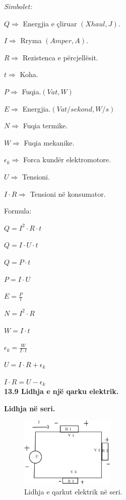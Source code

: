 \documentclass[twocolumn]{article}
\begin{document}
	\begin{center}
		\textit{Simbolet:}
	\end{center}
	
	$Q \Rightarrow $ Energjia e çliruar $(Xhaul,J)$.
	
	$I \Rightarrow $ Rryma $(Amper ,A )$.
	
	$R \Rightarrow $ Rezistenca e përcjellësit.
	
	$t \Rightarrow$ Koha.
	
	$P \Rightarrow $ Fuqia.$(Vat,W)$
	
	$E \Rightarrow $ Energjia.$(Vat/sekond,W/s)$
	
	$N \Rightarrow $ Fuqia termike.
	
	$W \Rightarrow $ Fuqia mekanike.
	
	$\epsilon_k \Rightarrow $ Forca kundër elektromotore.
	
	$U \Rightarrow $ Tensioni.
	
	$I \cdot R \Rightarrow$ Tensioni në konsumator.
	\begin{center}
		Formula:
	\end{center}
	
	$Q=I^2 \cdot R \cdot t$
	
	$Q=I \cdot U \cdot t$
	
	$Q= P\cdot t$
	
	$P= I \cdot U$
	
	$E=\frac{P}{t}$
	
	$N=I^2 \cdot R$
	
	$W=I \cdot t$
	
	$\epsilon_k=\frac{W}{I \cdot t}$
	
	$U=I \cdot R + \epsilon_k$
	
	$I \cdot R =  U - \epsilon_k$\\
	
	\textbf{13.9 Lidhja e një qarku elektrik.}
	
	\begin{center}
		\textbf{Lidhja në seri.}
	\end{center}
	
	\begin{figure}[h]
		\includegraphics[width=45mm]{Imazhet/qarku seri.png}
		\caption{Lidhja e qarkut elektrik në seri.}
		\label{fig:boat1}
	\end{figure}
	
\end{document}
